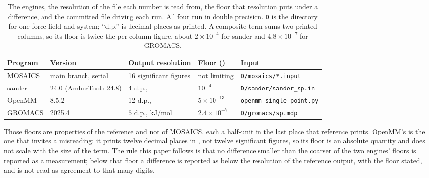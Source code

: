 \begin{table}[t]
\centering
\footnotesize
\setlength{\tabcolsep}{4pt}
\caption{The engines, the resolution of the file each number is read from, the
floor that resolution puts under a difference, and the committed file driving
each run. All four run in double precision. \texttt{D} is the directory for one
force field and system; ``d.p.'' is decimal places as printed. A composite term
sums two printed columns, so its floor is twice the per-column figure, about
$2\times10^{-4}$ for sander and $4.8\times10^{-7}$ for GROMACS.}
\label{tab:engines}
\begin{tabular}{@{}lllll@{}}
\toprule
Program & Version & Output resolution & Floor (\kcal{}) & Input \\
\midrule
MOSAICS & main branch, serial & 16 significant figures & not limiting & \texttt{D/mosaics/*.input} \\
sander  & 24.0 (AmberTools 24.8)\cite{case2023ambertools} & 4 d.p., \kcal{} & $10^{-4}$ & \texttt{D/sander/sander\_sp.in} \\
OpenMM  & 8.5.2\cite{eastman2017openmm7,eastman2024openmm8} & 12 d.p., \kcal{} & $5\times10^{-13}$ & \texttt{openmm\_single\_point.py} \\
GROMACS & 2025.4\cite{abraham2015gromacs} & 6 d.p., kJ/mol & $2.4\times10^{-7}$ & \texttt{D/gromacs/sp.mdp} \\
\bottomrule
\end{tabular}
\end{table}

Those floors are properties of the reference and not of MOSAICS, each a
half-unit in the last place that reference prints. OpenMM's is the one that
invites a misreading: it prints twelve decimal places in \kcal{}, not twelve
significant figures, so its floor is an absolute quantity and does not scale
with the size of the term. The rule this paper follows is that no difference
smaller than the coarser of the two engines' floors is reported as a
measurement; below that floor a difference is reported as below the resolution
of the reference output, with the floor stated, and is not read as agreement to
that many digits.

